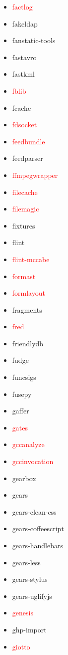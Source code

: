 \documentclass{l4proj}
\begin{document}
\begin{appendices}
{\begin{itemize}
\item\textcolor{red}{factlog}
\item fakeldap
\item fanstatic-tools
\item fastavro
\item fastkml
\item\textcolor{red}{fblib}
\item fcache
\item\textcolor{red}{fdsocket}
\item\textcolor{red}{feedbundle}
\item feedparser
\item\textcolor{red}{ffmpegwrapper}
\item\textcolor{red}{filecache}
\item\textcolor{red}{filemagic}
\item fixtures
\item flint
\item\textcolor{red}{flint-mccabe}
\item\textcolor{red}{formast}
\item\textcolor{red}{formlayout}
\item fragments
\end{itemize}
}%
\noindent\parbox[t]{0.32\textwidth}{\raggedright%
\begin{itemize}
\item\textcolor{red}{fred}
\item friendlydb
\item fudge
\item funcsigs
\item fusepy
\item gaffer
\item\textcolor{red}{gates}
\item\textcolor{red}{gccanalyze}
\item\textcolor{red}{gccinvocation}
\item gearbox
\item gears
\item gears-clean-css
\item gears-coffeescript
\item gears-handlebars
\item gears-less
\item gears-stylus
\item gears-uglifyjs
\item\textcolor{red}{genesis}
\item ghp-import
\item\textcolor{red}{giotto}

\end{itemize}}
\end{appendices}
\end{document}
